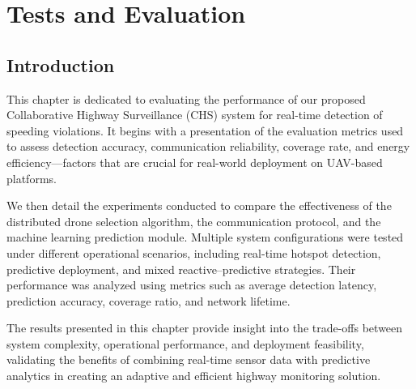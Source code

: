 \chapter{Tests and Evaluation} 


\section*{Introduction}

This chapter is dedicated to evaluating the performance of our proposed Collaborative Highway Surveillance (CHS) system for real-time detection of speeding violations. It begins with a presentation of the evaluation metrics used to assess detection accuracy, communication reliability, coverage rate, and energy efficiency—factors that are crucial for real-world deployment on UAV-based platforms.

We then detail the experiments conducted to compare the effectiveness of the distributed drone selection algorithm, the communication protocol, and the machine learning prediction module. Multiple system configurations were tested under different operational scenarios, including real-time hotspot detection, predictive deployment, and mixed reactive–predictive strategies. Their performance was analyzed using metrics such as average detection latency, prediction accuracy, coverage ratio, and network lifetime.

The results presented in this chapter provide insight into the trade-offs between system complexity, operational performance, and deployment feasibility, validating the benefits of combining real-time sensor data with predictive analytics in creating an adaptive and efficient highway monitoring solution.